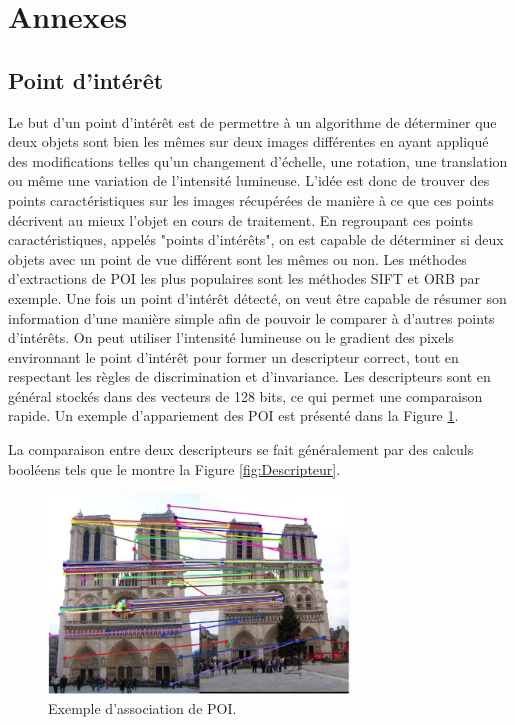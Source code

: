 \documentclass[11pt]{article}
\begin{document}
    \printbibliography[heading=none]

  \pagebreak
  
  \section{Annexes}

    \subsection*{Point d'intérêt}
      Le but d'un point d'intérêt est de permettre à un algorithme de déterminer que deux objets sont bien les mêmes sur deux images 
      différentes en ayant appliqué des modifications telles qu'un changement d'échelle, une rotation, une translation ou même une 
      variation de l'intensité lumineuse.
      L'idée est donc de trouver des points caractéristiques sur les images récupérées de manière à ce que ces points décrivent au mieux 
      l'objet en cours de traitement. En regroupant ces points caractéristiques, appelés "points d'intérêts", on est capable de déterminer 
      si deux objets avec un point de vue différent sont les mêmes ou non. Les méthodes d'extractions de POI les plus populaires 
      sont les méthodes SIFT et ORB par exemple.
      Une fois un point d'intérêt détecté, on veut être capable de résumer son information d'une manière simple afin de pouvoir le comparer
      à d'autres points d'intérêts. On peut utiliser l'intensité lumineuse ou le gradient des pixels environnant le point d'intérêt pour 
      former un descripteur correct, tout en respectant les règles de discrimination et d'invariance. Les descripteurs sont en général 
      stockés dans des vecteurs de 128 bits, ce qui permet une comparaison rapide.
      Un exemple d'appariement des POI est présenté dans la Figure \ref{fig:Appariement}. 

      La comparaison entre deux descripteurs se fait généralement par des calculs booléens tels que le montre la 
      Figure \ref{fig:Descripteur}.

      \begin{figure}[hbt]  
        \centering
        \includegraphics[width=80mm]{AssociationPOI.png}    
        \caption{Exemple d'association de POI.}
        \label{fig:Appariement}
      \end{figure} 
      
\end{document}
